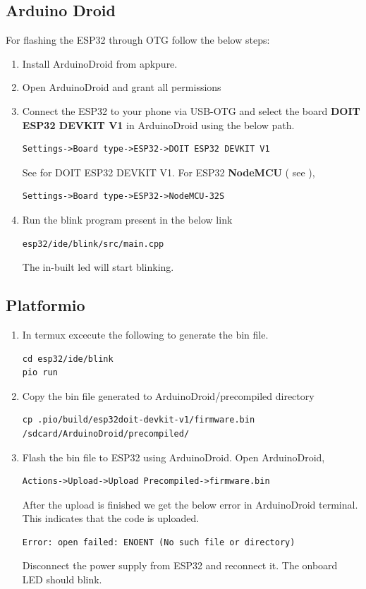 \subsection{Arduino Droid}
For flashing the ESP32 through OTG follow the below steps:
\begin{enumerate}
	\item Install ArduinoDroid from apkpure.
	\item Open ArduinoDroid and grant all permissions
	\item Connect the ESP32 to your phone via USB-OTG and select the board \textbf{DOIT ESP32 DEVKIT V1} in ArduinoDroid using the below path.
	\begin{lstlisting}
Settings->Board type->ESP32->DOIT ESP32 DEVKIT V1
	\end{lstlisting}
    See 
for DOIT ESP32 DEVKIT V1.
		For ESP32 \textbf{NodeMCU} ( see
		),
	\begin{lstlisting}
Settings->Board type->ESP32->NodeMCU-32S
	\end{lstlisting}
	\item Run the blink program present in the below link
	\begin{lstlisting}
esp32/ide/blink/src/main.cpp
	\end{lstlisting}
	The in-built led will start blinking.\\
\end{enumerate}
\subsection{Platformio}
	\begin{enumerate}
	\item In termux excecute the following to generate the bin file.
	\begin{lstlisting}
cd esp32/ide/blink
pio run
	\end{lstlisting}
\item Copy the bin file generated to ArduinoDroid/precompiled directory 
	\label{esp32:firmware}
	\begin{lstlisting}
cp .pio/build/esp32doit-devkit-v1/firmware.bin /sdcard/ArduinoDroid/precompiled/
	\end{lstlisting}
	\item Flash the bin file to ESP32 using ArduinoDroid. Open ArduinoDroid, 
	\begin{lstlisting}
Actions->Upload->Upload Precompiled->firmware.bin
	\end{lstlisting}
	After the upload is finished we get the below error in ArduinoDroid terminal. This indicates that the code is uploaded.
	\begin{lstlisting}
Error: open failed: ENOENT (No such file or directory)
	\end{lstlisting}
	Disconnect the power supply from ESP32 and reconnect it. The onboard LED should blink.
	\end{enumerate}
